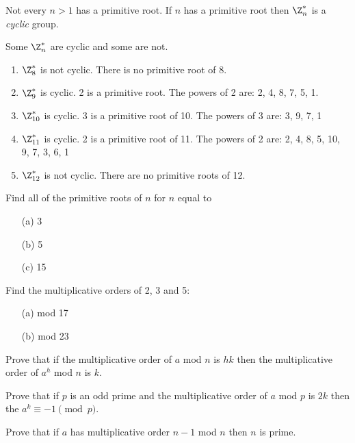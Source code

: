 \documentclass[oneside,12pt]{amsart}
\begin{document}
Not every $n>1$ has a primitive root. If $n$ has a primitive root then $\Z^*_n$ is a \emph{cyclic} group.

\begin{in_class_example} Some $\Z^*_n$ are cyclic and some are not.
\begin{enumerate}
\item $\Z^*_8$ is not cyclic. There is no primitive root of 8.
\item $\Z^*_9$ is cyclic. 2 is a primitive root. The powers of 2 are: 2, 4, 8, 7, 5, 1.
\item $\Z^*_{10}$ is cyclic. 3 is a primitive root of 10. The powers of 3 are: 3, 9, 7, 1
\item $\Z^*_{11}$ is cyclic. 2 is a primitive root of 11. The powers of 2 are: 2, 4, 8, 5, 10, 9, 7, 3, 6, 1
\item $\Z^*_{12}$ is not cyclic. There are no primitive roots of 12.
\end{enumerate}
\end{in_class_example}

\begin{homework}
Find all of the primitive roots of $n$ for $n$ equal to
\begin{enumerate}
\item[{(a)}] 3
\item[{(b)}] 5
\item[{(c})] 15
\end{enumerate}
\end{homework}

\begin{homework} Find the multiplicative orders of 2, 3 and 5:
\begin{enumerate}
\item[(a)] mod 17
\item[(b)] mod 23
\end{enumerate}
\end{homework}

\begin{homework}
\label{OrderOfAToTheHIsK}
Prove that if the multiplicative order of $a$ mod $n$ is $hk$ then the multiplicative order of $a^h$ mod $n$ is $k$.
\end{homework}

\begin{homework}
Prove that if $p$ is an odd prime and the multiplicative order of $a$ mod $p$ is $2k$ then the 
$a^k\equiv -1 \pmod p$.
\end{homework}

\begin{homework}
Prove that if $a$ has multiplicative order $n-1$ mod $n$ then $n$ is prime.
\end{homework}
\end{document}
